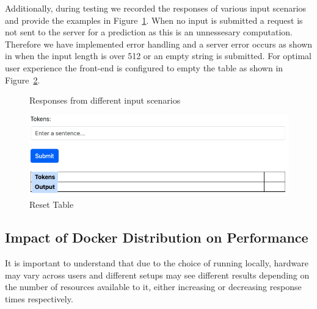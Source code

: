 \documentclass{surreydissertation}
\begin{document}
Additionally, during testing we recorded the responses of various input scenarios and provide the examples in Figure~\ref{fig:responses}. When no input is submitted a request is not sent to the server for a prediction as this is an unnessesary computation. Therefore we have implemented error handling and a server error occurs as shown in  when the input length is over 512 or an empty string is submitted. For optimal user experience the front-end is configured to empty the table as shown in Figure~\ref{fig:reset}.

\begin{figure}[H]
    \centering
    \caption{Responses from different input scenarios}
    \label{fig:responses}
\end{figure}


\begin{figure}[H]
    \centering
    \includegraphics[width=0.6\linewidth]{Figures/emptyfrontend.png}
    \caption{Reset Table}
    \label{fig:reset}
 \end{figure}

\subsection{Impact of Docker Distribution on Performance}
It is important to understand that due to the choice of running locally, hardware may vary across users and different setups may see different results depending on the number of resources available to it, either increasing or decreasing response times respectively. 
\end{document}
